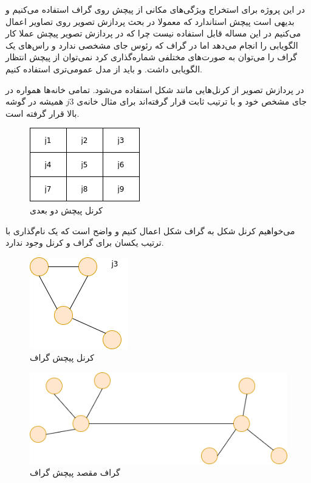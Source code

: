 در این پروژه برای استخراج ویژگی‌های مکانی از پیچش روی گراف استفاده می‌کنیم و بدیهی است پیچش استاندارد که معمولا
در بحث پردازش تصویر روی تصاویر اعمال می‌کنیم در این مساله قابل استفاده نیست
چرا که در پردازش تصویر پیچش عملا کار الگویابی را انجام می‌دهد اما در گراف که رئوس جای مشخصی ندارد
و راس‌های یک گراف را می‌توان به صورت‌های مختلفی
شماره‌گذاری کرد نمی‌توان از پیچش انتظار الگویابی داشت.
و باید از مدل عمومی‌تری استفاده کنیم.

در پردازش تصویر از کرنل‌هایی مانند شکل  استفاده می‌شود. تمامی خانه‌ها همواره در جای مشخص خود و با ترتیب ثابت قرار گرفته‌اند
برای مثال خانه‌ی $j3$ همیشه در گوشه بالا قرار گرفته است.

\begin{figure}
  \includegraphics[]{./images/2d-convolution.png}
  \centering
  \caption{کرنل پیچش دو بعدی}
  \label{fig:2d-convolution}
\end{figure}

می‌خواهیم کرنل شکل 
به گراف شکل  اعمال کنیم و واضح است که یک نام‌گذاری با ترتیب یکسان برای گراف و کرنل وجود ندارد.


\begin{figure}
  \includegraphics[]{./images/graph-convolution-kernel.png}
  \centering
  \caption{کرنل پیچش گراف}
  \label{fig:graph-convolution-kernel}
\end{figure}

\begin{figure}
  \includegraphics[]{./images/graph-convolution-graph.png}
  \centering
  \caption{گراف مقصد پیچش گراف}
  \label{fig:graph-convolution-graph}
\end{figure}


